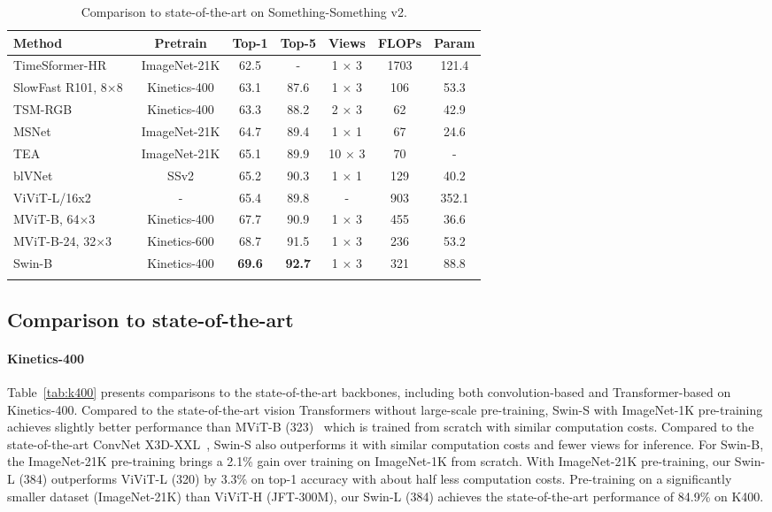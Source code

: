 \documentclass{article}
\newcommand{\demph}[1]{\textcolor[rgb]{0.565,0.565,0.565}{#1}}
\begin{document}
\begin{table}[t]
\caption{Comparison to state-of-the-art on Something-Something v2.}
\centering
  \begin{tabular}{l|c|cc|c|cc}
  \Xhline{1.0pt}
  Method & Pretrain & Top-1 & Top-5 & Views & FLOPs & Param  \\
  \hline
  TimeSformer-HR~\cite{timesformer2021} & ImageNet-21K & 62.5 & - & 1 × 3 & 1703 & 121.4 \\
  SlowFast R101, 8×8~\cite{feichtenhofer2019slowfast} & Kinetics-400 & 63.1 & 87.6 & 1 × 3 & 106 & 53.3 \\
  TSM-RGB~\cite{lin2019tsm} & Kinetics-400 & 63.3 & 88.2 & 2 × 3 & 62 & 42.9\\
  MSNet~\cite{kwon2020motionsqueeze}	& ImageNet-21K & 64.7 & 89.4 & 1 × 1 & 67&24.6 \\
  TEA~\cite{li2020tea} & ImageNet-21K & 65.1 & 89.9 & 10 × 3 & 70& -\\
  blVNet~\cite{fan2019more} & SSv2 & 65.2 & 90.3 & 1 × 1 & 129 & 40.2\\
  ViViT-L/16x2~\cite{arnab2021vivit} & - & 65.4 & 89.8 & - & 903 & 352.1\\
  MViT-B, 64×3~\cite{fan2021multiscale} & Kinetics-400 & 67.7 & 90.9 & 1 × 3 & 455 & 36.6 \\
  \demph{MViT-B-24, 32×3~\cite{fan2021multiscale}} & \demph{Kinetics-600} & \demph{68.7} & \demph{91.5} & \demph{1 × 3} & \demph{236} & \demph{53.2}\\
  \hline
  Swin-B & Kinetics-400 & \textbf{69.6} & \textbf{92.7} & 1 × 3 & 321 & 88.8 \\
  \Xhline{1.0pt}
  \end{tabular}
\label{tab:ssv2}
\end{table}


\subsection{Comparison to state-of-the-art}
\paragraph{Kinetics-400} Table~\ref{tab:k400} presents comparisons to the state-of-the-art backbones, including both convolution-based and Transformer-based on Kinetics-400.
Compared to the state-of-the-art vision Transformers without large-scale pre-training, Swin-S with ImageNet-1K pre-training achieves slightly better performance than MViT-B (323)~\cite{mvit2021} which is trained from scratch with similar computation costs. Compared to the state-of-the-art ConvNet X3D-XXL~\cite{feichtenhofer2020x3d}, Swin-S also outperforms it with similar computation costs and fewer views for inference.
For Swin-B, the ImageNet-21K pre-training brings a 2.1\% gain over training on ImageNet-1K from scratch. 
With ImageNet-21K pre-training, our Swin-L (384) outperforms ViViT-L (320) by 3.3\% on top-1 accuracy with about half less computation costs.
Pre-training on a significantly smaller dataset (ImageNet-21K) than ViViT-H (JFT-300M), our Swin-L (384) achieves the state-of-the-art performance of 84.9\% on K400.
\end{document}
